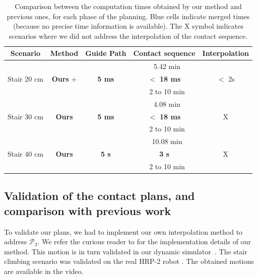 \begin{table}
\centering
\begin{tabular}{ c | c | c | c | c }
 Scenario & Method  & Guide Path & Contact sequence & Interpolation \\
 \hline
   \multirow{3}{*}{Stair 20 cm} & \citeauthor{Hauser06usingmotion} &  \multicolumn{3}{c}{\cellcolor{blue!25}5.42 min}  \\
							 & \textbf{Ours} + \citeauthor{Carpentier2016}  & \textbf{5 ms} & $\mathbf{<}$ \textbf{18 ms} & $ <$ 2s \\
							 & \citeauthor{Mordatch:2012:DCB:2185520.2185539} &  \multicolumn{3}{c}{\cellcolor{blue!25}2 to 10 min} \\
 \hline
   \multirow{3}{*}{Stair 30 cm} & \citeauthor{Hauser06usingmotion} &  \multicolumn{3}{c}{\cellcolor{blue!25}4.08 min}  \\
							 & \textbf{Ours}  & \textbf{5 ms} & $\mathbf{<}$ \textbf{18 ms} & X \\
							 & \citeauthor{Mordatch:2012:DCB:2185520.2185539} &  \multicolumn{3}{c}{\cellcolor{blue!25}2 to 10 min} \\
 \hline
   \multirow{3}{*}{Stair 40 cm} & \citeauthor{Hauser06usingmotion} &  \multicolumn{3}{c}{\cellcolor{blue!25}10.08 min}  \\
							 & \textbf{Ours}  & \textbf{5 s} & \textbf{3 s} & X \\
							 & \citeauthor{Mordatch:2012:DCB:2185520.2185539} &  \multicolumn{3}{c}{\cellcolor{blue!25}2 to 10 min} \\
 \end{tabular}
\caption{Comparison between the computation times obtained by our method and previous ones, for each phase of the planning. Blue cells indicate merged times (because no
precise time information is available). The X symbol indicates scenarios where we did not address the interpolation of the contact sequence.}
\label{tab:compprev}
\quad
\end{table}

\subsection{Validation of the contact plans, and comparison with previous work} \label{sec:compa}
To validate our plans, we had to implement our own interpolation method to address $\mathcal{P}_3$.
We refer the curious reader to \citep{Carpentier2016} for the implementation details of our method. 
This motion is in turn validated in our dynamic simulator~\citep{DelPrete2015b}. The stair climbing scenario was validated on the real HRP-2 robot \citep{Carpentier2016}.
The obtained motions are available in the video.


